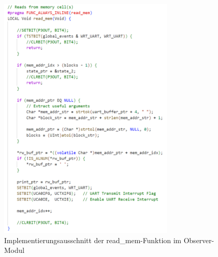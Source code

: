 \newpage
\begin{figure}[h!]
	\centering
	\includegraphics[width=0.75\textwidth]{../Bilder/ObserverModule/read_mem.png}
	\caption{Implementierungsausschnitt der read\_mem-Funktion im Observer-Modul}
	\label{fig:read_mem_function}
\end{figure}


